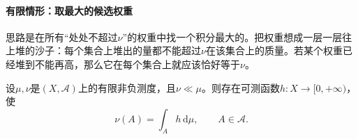 \paragraph{有限情形：取最大的候选权重}
思路是在所有“处处不超过$\nu$”的权重中找一个积分最大的。把权重想成一层一层往上堆的沙子：每个集合上堆出的量都不能超过$\nu$在该集合上的质量。若某个权重已经堆到不能再高，那么它在每个集合上就应该恰好等于$\nu$。

\begin{lemma}[有限测度的密度存在]
\label{lem:dens-rn-finite}
设$\mu,\nu$是$(X,\mathcal A)$上的有限非负测度，且$\nu\ll\mu$。则存在可测函数$h:X\to[0,+\infty)$，使
\begin{equation}
\nu(A)=\int_Ah\,\mathrm d\mu ,\qquad A\in\mathcal A .
\label{eq:dens-rn-finite}
\end{equation}
\end{lemma}

